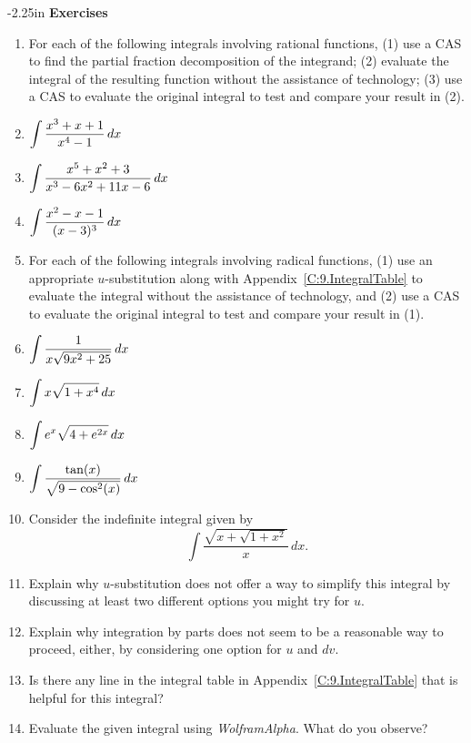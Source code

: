 \begin{adjustwidth*}{}{-2.25in}
\textbf{{\large Exercises}}
\setlength{\columnsep}{25pt}
\begin{multicols*}{2}
 \small

\begin{enumerate}[1)]
  \item For each of the following integrals involving rational functions, (1) use a CAS to find the partial fraction decomposition of the integrand; (2) evaluate the integral of the resulting function without the assistance of technology; (3) use a CAS to evaluate the original integral to test and compare your result in (2).
  \ba
  	\item $\displaystyle \int \frac{x^3 + x + 1}{x^4 - 1} \, dx$
	\item $\displaystyle \int \frac{x^5 + x^2 + 3}{x^3 - 6x^2 + 11x - 6} \, dx$
	\item $\displaystyle \int \frac{x^2 - x - 1}{(x-3)^3} \, dx$
  \ea

  \item For each of the following integrals involving radical functions, (1) use an appropriate $u$-substitution along with Appendix~\ref{C:9.IntegralTable} to evaluate the integral without the assistance of technology, and (2) use a CAS to evaluate the original integral to test and compare your result in (1).
  \ba
  	\item $\displaystyle \int \frac{1}{x \sqrt{9x^2 + 25}} \, dx$
	\item $\displaystyle \int x \sqrt{1 + x^4} \, dx$
	\item $\displaystyle \int  e^x \sqrt{4 + e^{2x}} \, dx$
	\item $\displaystyle \int \frac{\tan(x)}{\sqrt{9 - \cos^2(x)}}  \, dx$
  \ea

  
  \item Consider the indefinite integral given by
   $$\int \frac{\sqrt{x+\sqrt{1+x^2}}}{x} \, dx.$$
  	\ba
		\item Explain why $u$-substitution does not offer a way to simplify this integral by discussing at least two different options you might try for $u$.
		\item Explain why integration by parts does not seem to be a reasonable way to proceed, either, by considering one option for $u$ and $dv$.
		\item Is there any line in the integral table in Appendix~\ref{C:9.IntegralTable} that is helpful for this integral?
		\item Evaluate the given integral using \emph{WolframAlpha}.  What do you observe?
	\ea
\end{enumerate}

\end{multicols*}
\end{adjustwidth*}

